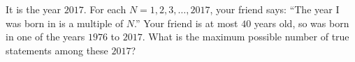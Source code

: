 It is the year $2017$. For each $N=1,2,3,\dots,2017$, your friend says: ``The year I was born in is a multiple of $N$.'' Your friend is at most $40$ years old, so was born in one of the years $1976$ to $2017$. What is the maximum possible number of true statements among these $2017$?
